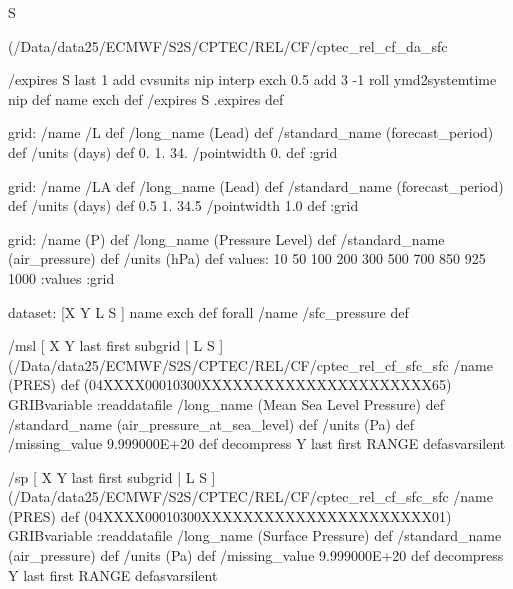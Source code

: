 \begin{ingrid}
S {(/Data/data25/ECMWF/S2S/CPTEC/REL/CF/cptec_rel_cf_da_sfc%

/expires
  S last
    1 add
    cvsunits nip interp exch
      0.5 add
      3 -1 roll
      ymd2systemtime
    nip
def
name exch def
/expires S  .expires def


grid:
/name /L def
/long_name (Lead) def
/standard_name (forecast_period) def
/units (days) def
0. 1. 34.
/pointwidth 0. def
:grid


grid:
/name /LA def
/long_name (Lead) def
/standard_name (forecast_period) def
/units (days) def
0.5 1. 34.5
/pointwidth 1.0 def
:grid



grid:
/name (P) def
/long_name (Pressure Level) def
/standard_name (air_pressure) def
/units (hPa) def
values: 10 50 100 200 300 500 700 850 925 1000 :values
:grid

dataset:
[X Y L S ] {name exch def } forall
/name /sfc_pressure def

/msl { [ X Y last first subgrid | L S ] (/Data/data25/ECMWF/S2S/CPTEC/REL/CF/cptec_rel_cf_sfc_sfc%
  /name (PRES) def
  (04XXXX00010300XXXXXXXXXXXXXXXXXXXXXX65) GRIBvariable
  :readdatafile
  /long_name (Mean Sea Level Pressure) def
  /standard_name (air_pressure_at_sea_level) def
  /units (Pa) def
  /missing_value 9.999000E+20 def
  decompress
  Y last first RANGE
} defasvarsilent

/sp { [ X Y last first subgrid | L S ] (/Data/data25/ECMWF/S2S/CPTEC/REL/CF/cptec_rel_cf_sfc_sfc%
  /name (PRES) def
  (04XXXX00010300XXXXXXXXXXXXXXXXXXXXXX01) GRIBvariable
  :readdatafile
  /long_name (Surface Pressure) def
  /standard_name (air_pressure) def
  /units (Pa) def
  /missing_value 9.999000E+20 def
  decompress
  Y last first RANGE
} defasvarsilent

}
\end{ingrid}

